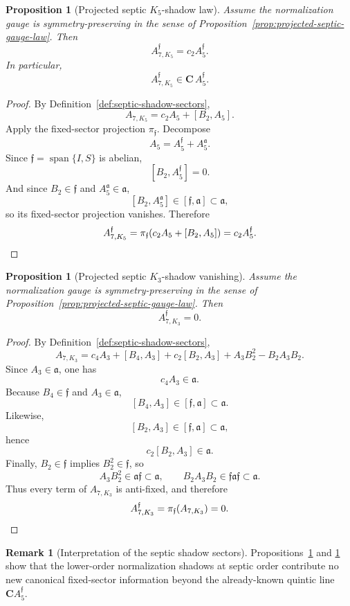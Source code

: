 \documentclass[11pt,a4paper]{amsart}
\theoremstyle{plain}
\newtheorem{proposition}[theorem]{Proposition}
\theoremstyle{definition}
\newtheorem{remark}[theorem]{Remark}
\begin{document}
\begin{proposition}[Projected septic $K_5$-shadow law]
\label{prop:projected-k5-shadow-law}
Assume the normalization gauge is symmetry-preserving in the sense of
Proposition~\ref{prop:projected-septic-gauge-law}. Then
\[
A_{7,K_5}^{\mathfrak f}=c_2A_5^{\mathfrak f}.
\]
In particular,
\[
A_{7,K_5}^{\mathfrak f}\in \mathbf C\,A_5^{\mathfrak f}.
\]
\end{proposition}

\begin{proof}
By Definition~\ref{def:septic-shadow-sectors},
\[
A_{7,K_5}=c_2A_5+[B_2,A_5].
\]
Apply the fixed-sector projection $\pi_{\mathfrak f}$. Decompose
\[
A_5=A_5^{\mathfrak f}+A_5^{\mathfrak a}.
\]
Since $\mathfrak f=\operatorname{span}\{I,S\}$ is abelian,
\[
[B_2,A_5^{\mathfrak f}]=0.
\]
And since $B_2\in\mathfrak f$ and $A_5^{\mathfrak a}\in\mathfrak a$,
\[
[B_2,A_5^{\mathfrak a}]\in[\mathfrak f,\mathfrak a]\subset\mathfrak a,
\]
so its fixed-sector projection vanishes. Therefore
\[
A_{7,K_5}^{\mathfrak f}
=
\pi_{\mathfrak f}(c_2A_5+[B_2,A_5])
=
c_2A_5^{\mathfrak f}.
\qedhere
\]
\end{proof}

\begin{proposition}[Projected septic $K_3$-shadow vanishing]
\label{prop:projected-k3-shadow-vanishing}
Assume the normalization gauge is symmetry-preserving in the sense of
Proposition~\ref{prop:projected-septic-gauge-law}. Then
\[
A_{7,K_3}^{\mathfrak f}=0.
\]
\end{proposition}

\begin{proof}
By Definition~\ref{def:septic-shadow-sectors},
\[
A_{7,K_3}
=
c_4A_3+[B_4,A_3]+c_2[B_2,A_3]+A_3B_2^2-B_2A_3B_2.
\]
Since $A_3\in\mathfrak a$, one has
\[
c_4A_3\in\mathfrak a.
\]
Because $B_4\in\mathfrak f$ and $A_3\in\mathfrak a$,
\[
[B_4,A_3]\in[\mathfrak f,\mathfrak a]\subset\mathfrak a.
\]
Likewise,
\[
[B_2,A_3]\in[\mathfrak f,\mathfrak a]\subset\mathfrak a,
\]
hence
\[
c_2[B_2,A_3]\in\mathfrak a.
\]
Finally, $B_2\in\mathfrak f$ implies $B_2^2\in\mathfrak f$, so
\[
A_3B_2^2\in\mathfrak a\mathfrak f\subset\mathfrak a,
\qquad
B_2A_3B_2\in\mathfrak f\mathfrak a\mathfrak f\subset\mathfrak a.
\]
Thus every term of $A_{7,K_3}$ is anti-fixed, and therefore
\[
A_{7,K_3}^{\mathfrak f}=\pi_{\mathfrak f}(A_{7,K_3})=0.
\qedhere
\]
\end{proof}

\begin{remark}[Interpretation of the septic shadow sectors]
\label{rem:septic-shadow-interpretation}
Propositions~\ref{prop:projected-k5-shadow-law} and
\ref{prop:projected-k3-shadow-vanishing} show that the lower-order
normalization shadows at septic order contribute no new canonical fixed-sector
information beyond the already-known quintic line
$\mathbf C A_5^{\mathfrak f}$.
\end{remark}
\end{document}
